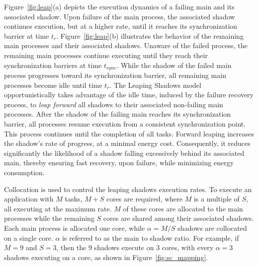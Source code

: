 Figure~\ref{fig:leap}(a) depicts the execution dynamics of a failing main and its associated shadow. Upon failure of the main process, the associated shadow continues execution, but at a higher rate, until it reaches its synchronization barrier at time $t_r$. 
Figure~\ref{fig:leap}(b) illustrates the behavior of the remaining main processes and their associated shadows. Unaware of the failed process, the remaining main processes continue executing until they reach their synchronization barriers at time $t_{sync}$. While the shadow of the failed main process progresses toward its synchronization barrier, all remaining main processes become idle until time $t_r$. %
The Leaping Shadows model opportunistically takes advantage of the idle time, induced by the failure recovery process, to {\it leap forward} all shadows to their associated non-failing main processes. 
After the shadow of the failing main reaches its synchronization barrier, all processes resume execution from a consistent synchronization point. This process continues until the completion of all tasks. Forward leaping increases the shadow's rate of progress, at a minimal energy cost. Consequently, it reduces significantly the likelihood of a shadow falling excessively behind its associated main, thereby ensuring fast recovery, upon failure, while minimizing energy consumption.

Collocation is used to control the leaping shadows execution rates. To execute an application with $M$ tasks, $M+S$ cores are required, where $M$ is a multiple of $S$, all executing at the maximum rate. $M$ of these cores are allocated to the main processes while the remaining $S$ cores are shared among their associated shadows. Each main process is allocated one core, while $\alpha=M/S$ shadows are collocated on a single core. $\alpha$ is referred to as the main to shadow ratio. For example, if $M=9$ and $S=3$, then the 9 shadows execute on 3 cores, with every $\alpha=3$ shadows executing on a core, as shown in Figure~\ref{fig:sc_mapping}.
  
